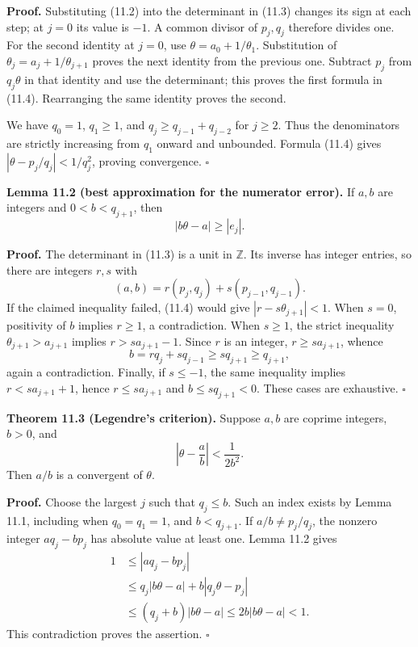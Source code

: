 \documentclass[
  11pt,
  a4paper,
]{article}
\begin{document}
\textbf{Proof.} Substituting (11.2) into the determinant in (11.3)
changes its sign at each step; at \(j=0\) its value is \(-1\). A common
divisor of \(p_j,q_j\) therefore divides one. For the second identity at
\(j=0\), use \(\theta=a_0+1/\theta_1\). Substitution of
\(\theta_j=a_j+1/\theta_{j+1}\) proves the next identity from the
previous one. Subtract \(p_j\) from \(q_j\theta\) in that identity and
use the determinant; this proves the first formula in (11.4).
Rearranging the same identity proves the second.

We have \(q_0=1\), \(q_1\ge1\), and \(q_j\ge q_{j-1}+q_{j-2}\) for
\(j\ge2\). Thus the denominators are strictly increasing from \(q_1\)
onward and unbounded. Formula (11.4) gives \(|\theta-p_j/q_j|<1/q_j^2\),
proving convergence. \(\square\)

\textbf{Lemma 11.2 (best approximation for the numerator error).} If
\(a,b\) are integers and \(0<b<q_{j+1}\), then \[
|b\theta-a|\ge |e_j|.
\tag{11.5}
\]

\textbf{Proof.} The determinant in (11.3) is a unit in \(\mathbb Z\).
Its inverse has integer entries, so there are integers \(r,s\) with \[
(a,b)=r(p_j,q_j)+s(p_{j-1},q_{j-1}).
\] If the claimed inequality failed, (11.4) would give
\(|r-s\theta_{j+1}|<1\). When \(s=0\), positivity of \(b\) implies
\(r\ge1\), a contradiction. When \(s\ge1\), the strict inequality
\(\theta_{j+1}>a_{j+1}\) implies \(r>s a_{j+1}-1\). Since \(r\) is an
integer, \(r\ge s a_{j+1}\), whence \[
b=rq_j+sq_{j-1}\ge s q_{j+1}\ge q_{j+1},
\] again a contradiction. Finally, if \(s\le-1\), the same inequality
implies \(r<s a_{j+1}+1\), hence \(r\le s a_{j+1}\) and
\(b\le s q_{j+1}<0\). These cases are exhaustive. \(\square\)

\textbf{Theorem 11.3 (Legendre's criterion).} Suppose \(a,b\) are
coprime integers, \(b>0\), and \[
\left|\theta-\frac ab\right|<\frac1{2b^2}.
\tag{11.6}
\] Then \(a/b\) is a convergent of \(\theta\).

\textbf{Proof.} Choose the largest \(j\) such that \(q_j\le b\). Such an
index exists by Lemma 11.1, including when \(q_0=q_1=1\), and
\(b<q_{j+1}\). If \(a/b\ne p_j/q_j\), the nonzero integer
\(a q_j-b p_j\) has absolute value at least one. Lemma 11.2 gives \[
\begin{aligned}
1&\le |a q_j-b p_j|\\
 &\le q_j|b\theta-a|+b|q_j\theta-p_j|\\
 &\le(q_j+b)|b\theta-a|\le2b|b\theta-a|<1.
\end{aligned}
\] This contradiction proves the assertion. \(\square\)
\end{document}
